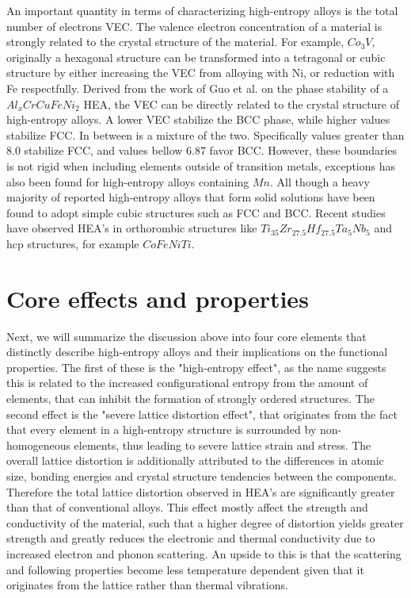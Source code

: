 An important quantity in terms of characterizing high-entropy alloys is the total number of electrons VEC. The valence electron concentration of a material is strongly related to the crystal structure of the material. For example, $Co_3V$, originally a hexagonal structure can be transformed into a tetragonal or cubic structure by either increasing the VEC from alloying with Ni, or reduction with Fe respectfully. Derived from the work of Guo et al. on the phase stability of a $Al_xCrCuFeNi_2$ HEA, the VEC can be directly related to the crystal structure of high-entropy alloys. A lower VEC stabilize the BCC phase, while higher values stabilize FCC. In between is a mixture of the two. Specifically values greater than 8.0 stabilize FCC, and values bellow 6.87 favor BCC. However, these boundaries is not rigid when including elements outside of transition metals, exceptions has also been found for high-entropy alloys containing $Mn$. All though a heavy majority of reported high-entropy alloys that form solid solutions have been found to adopt simple cubic structures such as FCC and BCC. Recent studies have observed HEA's in orthorombic structures like $Ti_{35}Zr_{27.5}Hf_{27.5}Ta_5Nb_5$ and hcp structures, for example $CoFeNiTi$.

\section{Core effects and properties}
Next, we will summarize the discussion above into four core elements that distinctly describe high-entropy alloys and their implications on the functional properties. The first of these is the "high-entropy effect", as the name suggests this is related to the increased configurational entropy from the amount of elements, that can inhibit the formation of strongly ordered structures. The second effect is the "severe lattice distortion effect", that originates from the fact that every element in a high-entropy structure is surrounded by non-homogeneous elements, thus leading to severe lattice strain and stress. The overall lattice distortion is additionally attributed to the differences in atomic size, bonding energies and crystal structure tendencies between the components. Therefore the total lattice distortion observed in HEA's are significantly greater than that of conventional alloys. This effect mostly affect the strength and conductivity of the material, such that a higher degree of distortion yields greater strength and greatly reduces the electronic and thermal conductivity due to increased electron and phonon scattering. An upside to this is that the scattering and following properties become less temperature dependent given that it originates from the lattice rather than thermal vibrations.
 
